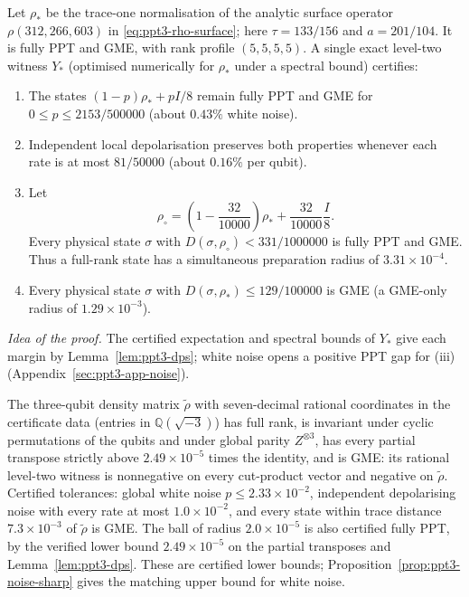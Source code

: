 \begin{corollary}
\label{cor:ppt3-noise-reused}
Let $\rho_*$ be the trace-one normalisation of the analytic
surface operator $\rho(312,266,603)$ in
\eqref{eq:ppt3-rho-surface}; here
$\tau=133/156$ and $a=201/104$.
It is fully PPT and GME, with rank profile $(5,5,5,5)$.
A single exact level-two witness $Y_*$ (optimised numerically for $\rho_*$ under a spectral bound)
certifies:
\begin{enumerate}[label=(\roman*)]
\item The states $(1-p)\rho_*+pI/8$ remain fully PPT
and GME for $0\le p\le2153/500000$
(about $0.43\%$ white noise).
\item Independent local depolarisation preserves both
properties whenever each rate is at most
$81/50000$ (about $0.16\%$ per qubit).
\item Let
\[
 \rho_\circ=\left(1-\frac{32}{10000}\right)\rho_*
                  +\frac{32}{10000}\frac I8 .
\]
Every physical state $\sigma$ with
$D(\sigma,\rho_\circ)<331/1000000$
is fully PPT and GME. Thus a full-rank state
has a simultaneous preparation radius of
$3.31\times10^{-4}$.
\item Every physical state $\sigma$ with
$D(\sigma,\rho_*)\le129/100000$
is GME (a GME-only radius of $1.29\times10^{-3}$).
\end{enumerate}
\end{corollary}

\emph{Idea of the proof.} The certified expectation and spectral bounds of $Y_*$ give each margin by
Lemma~\ref{lem:ppt3-dps}; white noise opens a positive PPT gap for (iii) (Appendix~\ref{sec:ppt3-app-noise}).

\begin{corollary}\label{cor:ppt3-robust}
The three-qubit density matrix $\tilde\rho$ with seven-decimal rational coordinates in the certificate data (entries in $\mathbb Q(\sqrt{-3})$) has
full rank, is invariant under cyclic permutations of the qubits and under global parity $Z^{\otimes3}$, has every partial
transpose strictly above $2.49\times10^{-5}$ times the identity, and is GME: its rational level-two witness is
nonnegative on every cut-product vector and negative on $\tilde\rho$. Certified tolerances: global white noise
$p\le2.33\times10^{-2}$, independent depolarising noise with every rate at most $1.0\times10^{-2}$, and every state
within trace distance $7.3\times10^{-3}$ of $\tilde\rho$ is GME. The ball of radius $2.0\times10^{-5}$ is also certified
fully PPT, by the verified lower bound $2.49\times10^{-5}$ on the partial transposes and Lemma~\ref{lem:ppt3-dps}.
These are certified lower bounds; Proposition~\ref{prop:ppt3-noise-sharp} gives the matching upper bound for white noise.
\end{corollary}

